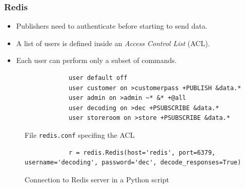 \begin{frame}[containsverbatim]
	\frametitle{Redis}
	
	\begin{itemize}
		\item Publishers need to authenticate before starting to send data.
		\item A list of users is defined inside an \emph{Access Control List} (ACL).
		\item Each user can perform only a subset of commands.
	\end{itemize}
	
	\begin{figure}[h]
		\begin{verbatim}
			user default off
			user customer on >customerpass +PUBLISH &data.*
			user admin on >admin ~* &* +@all
			user decoding on >dec +PSUBSCRIBE &data.*
			user storeroom on >store +PSUBSCRIBE &data.*
		\end{verbatim}
		\caption{File \texttt{redis.conf} specifing the ACL}
	\end{figure}
	
	\begin{figure}[h]
		\begin{verbatim}
			r = redis.Redis(host='redis', port=6379, username='decoding', password='dec', decode_responses=True)
		\end{verbatim}
		\caption{Connection to Redis server in a Python script}
	\end{figure}
\end{frame}


